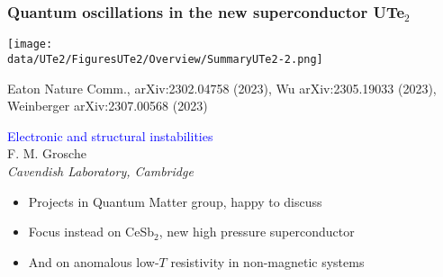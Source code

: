\begin{emptyframe}
    \frametitle{Quantum oscillations in the new superconductor UTe$_2$}
    \centerline{ \texttt{[image: \\data/UTe2/FiguresUTe2/Overview/SummaryUTe2-2.png]}}
\vspace{-1 em}
\vfill 
\centerline{\makebox[\linewidth]{\rule{0.85\textwidth}{0.4pt}}}
\centerline{\scriptsize Eaton Nature Comm., arXiv:2302.04758 (2023), Wu arXiv:2305.19033 (2023), Weinberger arXiv:2307.00568 (2023)}
\end{emptyframe}



\begin{emptyframe}
\begin{center}
\textcolor{Blue}{Electronic and structural instabilities} \\
\vspace{0.5em}
{\footnotesize F. M. Grosche} \\
{\footnotesize \em Cavendish Laboratory, Cambridge} \\
\vspace{0.1em}
\end{center}
\vspace{0.0em}

\begin{itemize}
    \item<1-> Projects in Quantum Matter group, happy to discuss
    \item<2-> Focus instead on CeSb$_2$, new high pressure superconductor
    \item<3-> And on anomalous low-$T$ resistivity in non-magnetic systems
\end{itemize}
\end{emptyframe}

